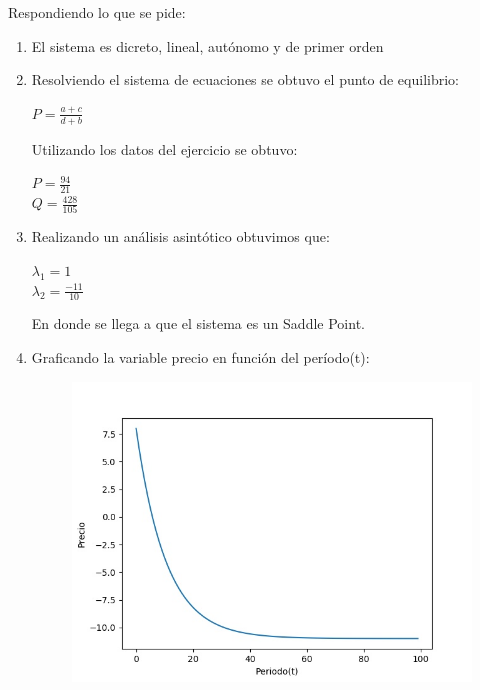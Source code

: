 \documentclass[11pt,a4paper]{article}
\begin{document}
		Respondiendo lo que se pide:
		\begin{enumerate}
			\item El sistema es dicreto, lineal, autónomo y de primer orden
			\item Resolviendo el sistema de ecuaciones se obtuvo el punto de equilibrio:
				\begin{center}
					$P = \frac{a+c}{d+b}$
				\end{center}
				Utilizando los datos del ejercicio se obtuvo:
				\begin{center}
					$P = \frac{94}{21}$\\
					\vspace*{0.15in}
					$Q = \frac{428}{105}$
				\end{center}
			
			\item Realizando un análisis asintótico obtuvimos que: 
				\begin{center}
					$\lambda_1 = 1$\\
					\vspace*{0.15in}
					$\lambda_2 = \frac{-11}{10}$
				\end{center}
				En donde se llega a que el sistema es un Saddle Point.
			\item Graficando la variable precio en función del período(t):
				\begin{figure}[H]
  					\centering
    					\includegraphics[width=14cm]{imagenes/precioTiempo}
				\end{figure}

		\end{enumerate}
		
\end{document}
